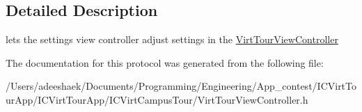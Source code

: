 \subsection{Detailed Description}
lets the settings view controller adjust settings in the \hyperlink{interface_virt_tour_view_controller}{Virt\-Tour\-View\-Controller} 

The documentation for this protocol was generated from the following file\-:\begin{DoxyCompactItemize}
\item 
/\-Users/adeeshaek/\-Documents/\-Programming/\-Engineering/\-App\-\_\-contest/\-I\-C\-Virt\-Tour\-App/\-I\-C\-Virt\-Tour\-App/\-I\-C\-Virt\-Campus\-Tour/Virt\-Tour\-View\-Controller.\-h\end{DoxyCompactItemize}
